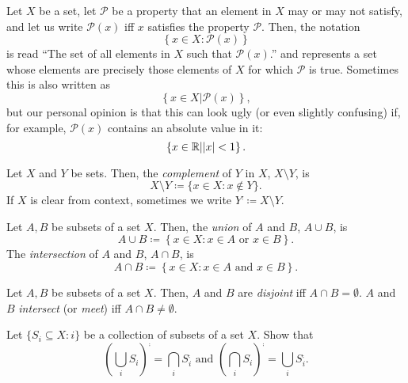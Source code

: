 \begin{textequation}
Let $X$ be a set, let $\mathcal{P}$ be a property that an element in $X$ may or may not satisfy, and let us write $\mathcal{P}(x)$ iff $x$ satisfies the property $\mathcal{P}$.  Then, the notation
\begin{equation*}
\left\{ x\in X:\mathcal{P}(x)\right\}
\end{equation*}
is read ``The set of all elements in $X$ such that $\mathcal{P}(x)$.'' and represents a set whose elements are precisely those elements of $X$ for which $\mathcal{P}$ is true.  Sometimes this is also written as
\begin{equation*}
\left\{ x\in X|\mathcal{P}(x)\right\} ,
\end{equation*}
but our personal opinion is that this can look ugly (or even slightly confusing) if, for example, $\mathcal{P}(x)$ contains an absolute value in it:
\begin{equation*}
\left\{ x\in \mathbb{R} |\lvert x\rvert<1\right\} .
\end{equation*}
\end{textequation}
\begin{dfn}[Complement]
Let $X$ and $Y$ be sets.  Then, the \emph{complement} of $Y$ in $X$, $X\setminus Y$, is
\begin{equation}
X\setminus Y\coloneqq \{ x\in X:x\notin Y\} .
\end{equation}
If $X$ is clear from context, sometimes we write $Y^{\comp}\coloneqq X\setminus Y$.
\end{dfn}
\begin{dfn}
Let $A,B$ be subsets of a set $X$.  Then, the \emph{union} of $A$ and $B$, $A\cup B$, is
\begin{equation}
A\cup B\coloneqq \left\{ x\in X:x\in A\text{ or }x\in B\right\} .
\end{equation}
The \emph{intersection} of $A$ and $B$, $A\cap B$, is
\begin{equation}
A\cap B\coloneqq \left\{ x\in X:x\in A\text{ and }x\in B\right\} .
\end{equation}
\end{dfn}
\begin{dfn}
Let $A,B$ be subsets of a set $X$.  Then, $A$ and $B$ are \emph{disjoint} iff $A\cap B=\emptyset$.  $A$ and $B$ \emph{intersect} (or \emph{meet}) iff $A\cap B\neq \emptyset$.
\end{dfn}
\begin{exr}\label{DeMorgansLaws}
Let $\{ S_i\subseteq X:i\}$ be a collection of subsets of a set $X$.  Show that
\begin{equation}
\left( \bigcup _iS_i\right) ^{\comp}=\bigcap _iS_i^{\comp}\text{ and }\left( \bigcap _iS_i\right) ^{\comp}=\bigcup _iS_i^{\comp}.
\end{equation}
\end{exr}

